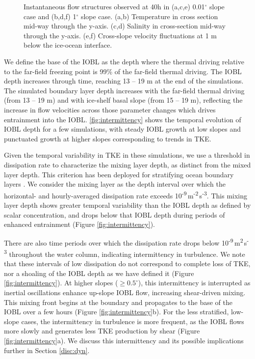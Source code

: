 \documentclass[draft]{styles/agujournal2019}
\begin{document}
\begin{figure}[]
\begin{minipage}{0.6\textwidth}
    \end{minipage}%
    \begin{minipage}{0.05\textwidth}
    \hfill
    \end{minipage}
    \caption{Instantaneous flow structures observed at 40h in (a,c,e) 0.01$^{\circ}$ slope case and (b,d,f) 1$^{\circ}$ slope case. (a,b) Temperature in cross section mid-way through the y-axis. (c,d) Salinity in cross-section mid-way through the y-axis. (e,f) Cross-slope velocity fluctuations at 1 m below the ice-ocean interface.}
    \label{fig:cross-section}
\end{figure}

We define the base of the IOBL as the depth where the thermal driving relative to the far-field freezing point is 99\% of the far-field thermal driving. The IOBL depth increases through time, reaching 13 -- 19 m at the end of the simulations. The simulated boundary layer depth increases with the far-field thermal driving (from 13 -- 19 m) and with ice-shelf basal slope (from 15 -- 19 m), reflecting the increase in flow velocities across those parameter changes which drives entrainment into the IOBL. \ref{fig:intermittency} shows the temporal evolution of IOBL depth for a few simulations, with steady IOBL growth at low slopes and punctuated growth at higher slopes corresponding to trends in TKE.

Given the temporal variability in TKE in these simulations, we use a threshold in dissipation rate to characterize the mixing layer depth, as distinct from the mixed layer depth. This criterion has been deployed for stratifying ocean boundary layers \cite{franks_has_2015, sutherland_mixed_2014}. We consider the mixing layer as the depth interval over which the horizontal- and hourly-averaged dissipation rate exceeds 10\textsuperscript{-9}\,m\textsuperscript{-2}\,s\textsuperscript{-3}. This mixing layer depth shows greater temporal variability than the IOBL depth as defined by scalar concentration, and drops below that IOBL depth during periods of enhanced entrainment (Figure \ref{fig:intermittency}). 

There are also time periods over which the dissipation rate drops below 10\textsuperscript{-9}\,m\textsuperscript{2}\,s\textsuperscript{-3} throughout the water column, indicating intermittency in turbulence. We note that these intervals of low dissipation do not correspond to complete loss of TKE, nor a shoaling of the IOBL depth as we have defined it (Figure \ref{fig:intermittency}). At higher slopes ($\geq 0.5^{\circ}$), this intermittency is interrupted as inertial oscillations enhance up-slope IOBL flow, increasing shear-driven mixing. This mixing front begins at the boundary and propagates to the base of the IOBL over a few hours (Figure \ref{fig:intermittency}b). For the less stratified, low-slope cases, the intermittency in turbulence is more frequent, as the IOBL flows more slowly and generates less TKE production by shear (Figure \ref{fig:intermittency}a). We discuss this intermittency and its possible implications further in Section \ref{disc:dyn}.
\end{document}
